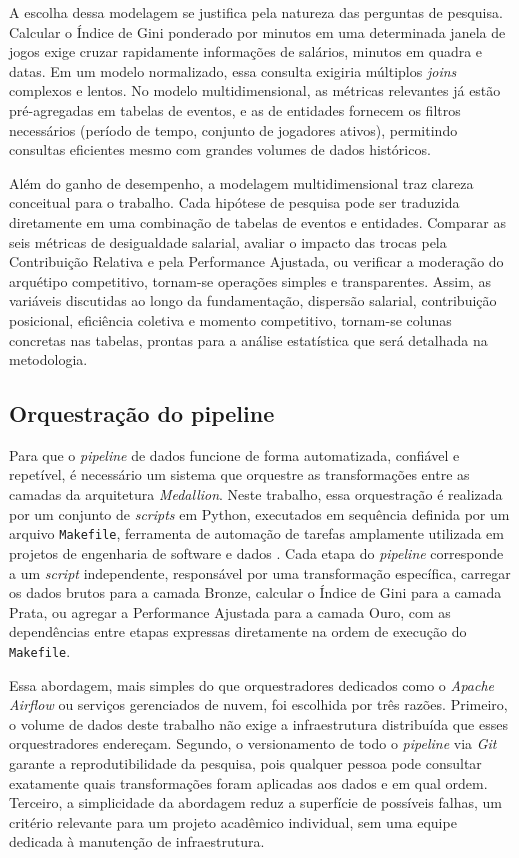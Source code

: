 A escolha dessa modelagem se justifica pela natureza das perguntas de pesquisa. Calcular o Índice de Gini ponderado por minutos em uma determinada janela de jogos exige cruzar rapidamente informações de salários, minutos em quadra e datas. Em um modelo normalizado, essa consulta exigiria múltiplos \textit{joins} complexos e lentos. No modelo multidimensional, as métricas relevantes já estão pré-agregadas em tabelas de eventos, e as de entidades fornecem os filtros necessários (período de tempo, conjunto de jogadores ativos), permitindo consultas eficientes mesmo com grandes volumes de dados históricos.

Além do ganho de desempenho, a modelagem multidimensional traz clareza conceitual para o trabalho. Cada hipótese de pesquisa pode ser traduzida diretamente em uma combinação de tabelas de eventos e entidades. Comparar as seis métricas de desigualdade salarial, avaliar o impacto das trocas pela Contribuição Relativa e pela Performance Ajustada, ou verificar a moderação do arquétipo competitivo, tornam-se operações simples e transparentes. Assim, as variáveis discutidas ao longo da fundamentação, dispersão salarial, contribuição posicional, eficiência coletiva e momento competitivo, tornam-se colunas concretas nas tabelas, prontas para a análise estatística que será detalhada na metodologia.

\subsection{Orquestração do pipeline}
\label{sec:pipeline_orchestration}

Para que o \textit{pipeline} de dados funcione de forma automatizada, confiável e repetível, é necessário um sistema que orquestre as transformações entre as camadas da arquitetura \textit{Medallion}. Neste trabalho, essa orquestração é realizada por um conjunto de \textit{scripts} em Python, executados em sequência definida por um arquivo \texttt{Makefile}, ferramenta de automação de tarefas amplamente utilizada em projetos de engenharia de software e dados \citep{gnu_make}. Cada etapa do \textit{pipeline} corresponde a um \textit{script} independente, responsável por uma transformação específica, carregar os dados brutos para a camada Bronze, calcular o Índice de Gini para a camada Prata, ou agregar a Performance Ajustada para a camada Ouro, com as dependências entre etapas expressas diretamente na ordem de execução do \texttt{Makefile}.

Essa abordagem, mais simples do que orquestradores dedicados como o \textit{Apache Airflow} ou serviços gerenciados de nuvem, foi escolhida por três razões. Primeiro, o volume de dados deste trabalho não exige a infraestrutura distribuída que esses orquestradores endereçam. Segundo, o versionamento de todo o \textit{pipeline} via \textit{Git} garante a reprodutibilidade da pesquisa, pois qualquer pessoa pode consultar exatamente quais transformações foram aplicadas aos dados e em qual ordem. Terceiro, a simplicidade da abordagem reduz a superfície de possíveis falhas, um critério relevante para um projeto acadêmico individual, sem uma equipe dedicada à manutenção de infraestrutura.

